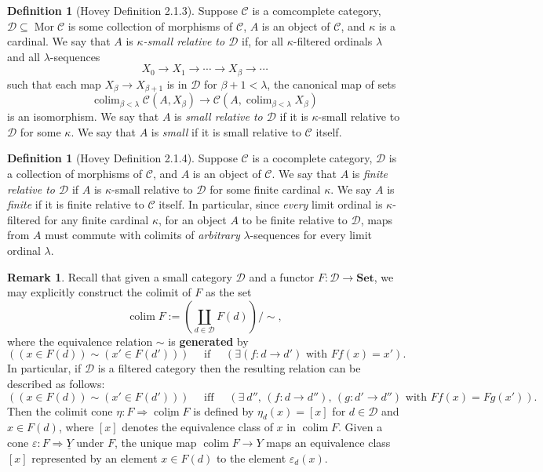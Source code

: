 \documentclass{amsart}
\theoremstyle{plain}
\theoremstyle{definition}
\newtheorem{remark}[theorem]{Remark}
\newtheorem{definition}[theorem]{Definition}
\newcommand{\Set}{\mbf{Set}}
\newcommand{\sseq}{\subseteq}
\newcommand{\0}{\mathbf{0}}
\newcommand{\cC}{\mathcal C}
\newcommand{\cD}{\mathcal D}
\newcommand{\mbf}[1]{\mathbf{#1}}
\newcommand{\ul}{\underline}
\newcommand{\vare}{\varepsilon}
\renewcommand{\(}{\left(}
\renewcommand{\)}{\right)}
\DeclareMathOperator*{\colim}{colim}
\DeclareMathOperator{\Mor}{Mor}
\begin{document}
\begin{definition}[Hovey Definition 2.1.3]\label{2.1.3}
  Suppose $\cC$ is a comcomplete category, $\cD\sseq\Mor\cC$ is some collection of morphisms of $\cC$, $A$ is an object of $\cC$, and $\kappa$ is a cardinal. We say that $A$ is \textit{$\kappa$-small relative to $\cD$} if, for all $\kappa$-filtered ordinals $\lambda$ and all $\lambda$-sequences
  \[X_0\to X_1\to\cdots\to X_\beta\to\cdots\]
  such that each map $X_\beta\to X_{\beta+1}$ is in $\cD$ for $\beta+1<\lambda$, the canonical map of sets
  \[\colim_{\beta<\lambda}\cC(A,X_\beta)\to\cC(A,\colim_{\beta<\lambda}X_\beta)\]
  is an isomorphism. We say that $A$ is \textit{small relative to $\cD$} if it is $\kappa$-small relative to $\cD$ for some $\kappa$. We say that $A$ is \textit{small} if it is small relative to $\cC$ itself.
\end{definition}

\begin{definition}[Hovey Definition 2.1.4]
  Suppose $\cC$ is a cocomplete category, $\cD$ is a collection of morphisms of $\cC$, and $A$ is an object of $\cC$. We say that $A$ is \textit{finite relative to $\cD$} if $A$ is $\kappa$-small relative to $\cD$ for some finite cardinal $\kappa$. We say $A$ is \textit{finite} if it is finite relative to $\cC$ itself. In particular, since \textit{every} limit ordinal is $\kappa$-filtered for any finite cardinal $\kappa$, for an object $A$ to be finite relative to $\cD$, maps from $A$ must commute with colimits of \textit{arbitrary} $\lambda$-sequences for every limit ordinal $\lambda$.
\end{definition}

\begin{remark}\label{explicit_description_of_colimit_in_set}
Recall that given a small category $\cD$ and a functor $F:\cD\to\Set$, we may explicitly construct the colimit of $F$ as the set
\[\colim F:=\(\coprod_{d\in \cD}F(d)\)/\sim,\]
where the equivalence relation $\sim$ is \textbf{generated} by
\[((x\in F(d))\sim(x'\in F(d')))\quad\text{ if }\quad(\exists(f:d\to d')\text{ with }Ff(x)=x').\]
In particular, if $\cD$ is a filtered category then the resulting relation can be described as follows:
\begin{equation*}
  ((x\in F(d))\sim(x'\in F(d')))\quad\text{ iff }\quad(\exists\ d'',\,(f:d\to d''),\,(g:d'\to d'')\text{ with }Ff(x)=Fg(x')).
\end{equation*}
Then the colimit cone $\eta:F\Rightarrow\ul{\colim F}$ is defined by $\eta_d(x)=[x]$ for $d\in\cD$ and $x\in F(d)$, where $[x]$ denotes the equivalence class of $x$ in $\colim F$. Given a cone $\vare:F\Rightarrow\underline Y$ under $F$, the unique map $\colim F\to Y$ maps an equivalence class $[x]$ represented by an element $x\in F(d)$ to the element $\vare_d(x)$.
\end{remark}
\end{document}
